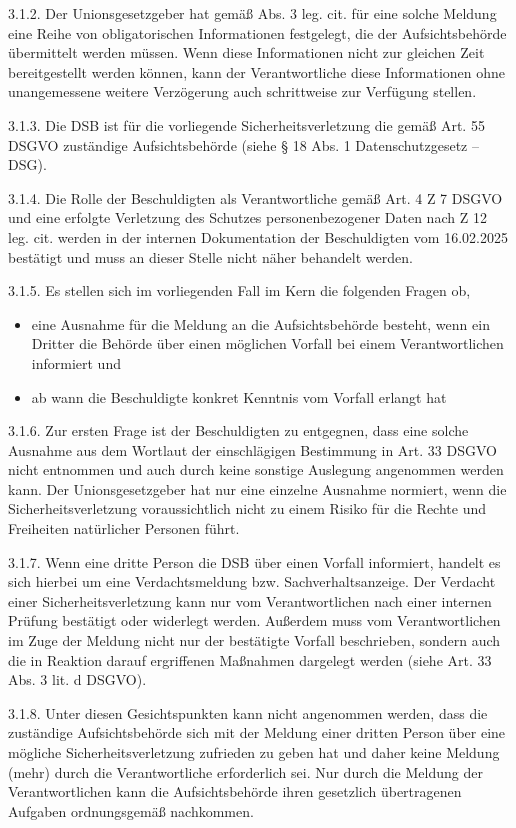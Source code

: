 \documentclass[11pt,a4paper]{article}
\begin{document}
3.1.2. Der Unionsgesetzgeber hat gemäß Abs. 3 leg. cit. für eine solche Meldung eine Reihe von obligatorischen Informationen festgelegt, die der Aufsichtsbehörde übermittelt werden müssen. Wenn diese Informationen nicht zur gleichen Zeit bereitgestellt werden können, kann der Verantwortliche diese Informationen ohne unangemessene weitere Verzögerung auch schrittweise zur Verfügung stellen.

3.1.3. Die DSB ist für die vorliegende Sicherheitsverletzung die gemäß Art. 55 DSGVO zuständige Aufsichtsbehörde (siehe § 18 Abs. 1 Datenschutzgesetz – DSG).

3.1.4. Die Rolle der Beschuldigten als Verantwortliche gemäß Art. 4 Z 7 DSGVO und eine erfolgte Verletzung des Schutzes personenbezogener Daten nach Z 12 leg. cit. werden in der internen Dokumentation der Beschuldigten vom 16.02.2025 bestätigt und muss an dieser Stelle nicht näher behandelt werden.

3.1.5. Es stellen sich im vorliegenden Fall im Kern die folgenden Fragen ob,

\begin{itemize}
\item eine Ausnahme für die Meldung an die Aufsichtsbehörde besteht, wenn ein Dritter die Behörde über einen möglichen Vorfall bei einem Verantwortlichen informiert und
\item ab wann die Beschuldigte konkret Kenntnis vom Vorfall erlangt hat
\end{itemize}

3.1.6. Zur ersten Frage ist der Beschuldigten zu entgegnen, dass eine solche Ausnahme aus dem Wortlaut der einschlägigen Bestimmung in Art. 33 DSGVO nicht entnommen und auch durch keine sonstige Auslegung angenommen werden kann. Der Unionsgesetzgeber hat nur eine einzelne Ausnahme normiert, wenn die Sicherheitsverletzung voraussichtlich nicht zu einem Risiko für die Rechte und Freiheiten natürlicher Personen führt.

3.1.7. Wenn eine dritte Person die DSB über einen Vorfall informiert, handelt es sich hierbei um eine Verdachtsmeldung bzw. Sachverhaltsanzeige. Der Verdacht einer Sicherheitsverletzung kann nur vom Verantwortlichen nach einer internen Prüfung bestätigt oder widerlegt werden. Außerdem muss vom Verantwortlichen im Zuge der Meldung nicht nur der bestätigte Vorfall beschrieben, sondern auch die in Reaktion darauf ergriffenen Maßnahmen dargelegt werden (siehe Art. 33 Abs. 3 lit. d DSGVO).

3.1.8. Unter diesen Gesichtspunkten kann nicht angenommen werden, dass die zuständige Aufsichtsbehörde sich mit der Meldung einer dritten Person über eine mögliche Sicherheitsverletzung zufrieden zu geben hat und daher keine Meldung (mehr) durch die Verantwortliche erforderlich sei. Nur durch die Meldung der Verantwortlichen kann die Aufsichtsbehörde ihren gesetzlich übertragenen Aufgaben ordnungsgemäß nachkommen.
\end{document}
